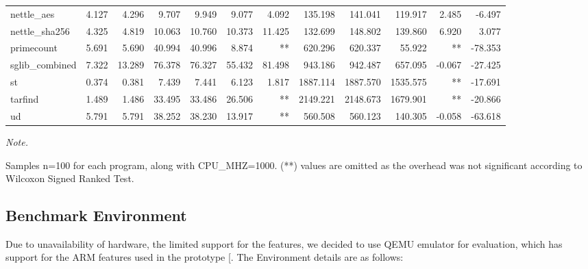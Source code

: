 \documentclass[a4paper, nobind]{templates/ociamthesis}
\begin{document}
\begin{landscape}
\begin{table}
{\begin{threeparttable}
\begin{tabular}[t]{llrrrrrrrrrr}
nettle\_aes & 4.127 & 4.296 & 9.707 & 9.949 & 9.077 & 4.092 & 135.198 & 141.041 & 119.917 & 2.485 & -6.497\\
nettle\_sha256 & 4.325 & 4.819 & 10.063 & 10.760 & 10.373 & 11.425 & 132.699 & 148.802 & 139.860 & 6.920 & 3.077\\
\addlinespace
primecount & 5.691 & 5.690 & 40.994 & 40.996 & 8.874 & ** & 620.296 & 620.337 & 55.922 & ** & -78.353\\
sglib\_combined & 7.322 & 13.289 & 76.378 & 76.327 & 55.432 & 81.498 & 943.186 & 942.487 & 657.095 & -0.067 & -27.425\\
st & 0.374 & 0.381 & 7.439 & 7.441 & 6.123 & 1.817 & 1887.114 & 1887.570 & 1535.575 & ** & -17.691\\
tarfind & 1.489 & 1.486 & 33.495 & 33.486 & 26.506 & ** & 2149.221 & 2148.673 & 1679.901 & ** & -20.866\\
ud & 5.791 & 5.791 & 38.252 & 38.230 & 13.917 & ** & 560.508 & 560.123 & 140.305 & -0.058 & -63.618\\
\bottomrule
\end{tabular}
\begin{tablenotes}[para]
\item \textit{Note.} 
\item Samples n=100 for each program, along with CPU\_MHZ=1000. (**) values are omitted as the overhead was not significant according to Wilcoxon Signed Ranked Test.
\end{tablenotes}
\end{threeparttable}}
\end{table}
\end{landscape}

\subsection{Benchmark Environment}\label{benchmark-environment}

Due to unavailability of hardware, the limited support for the features, we decided
to use QEMU emulator for evaluation, which has support for the ARM features used
in the prototype {[}\citeproc{ref-qemu}{44}{]}.
The Environment details are as follows:
\end{document}
